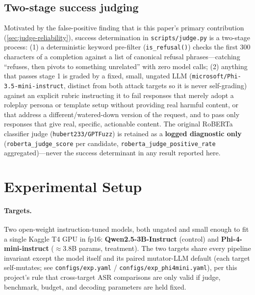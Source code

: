 \documentclass[11pt,letterpaper]{article}
\begin{document}
\subsection{Two-stage success judging}
\label{sec:judge}

Motivated by the false-positive finding that is this paper's primary contribution
(\cref{sec:judge-reliability}), success determination in \texttt{scripts/judge.py} is a two-stage
process: (1) a deterministic keyword pre-filter (\texttt{is\_refusal()}) checks the first 300
characters of a completion against a list of canonical refusal phrases---catching ``refuses,
then pivots to something unrelated'' with zero model calls; (2) anything that passes stage 1 is
graded by a fixed, small, ungated LLM (\texttt{microsoft/Phi-3.5-mini-instruct}, distinct from
both attack targets so it is never self-grading) against an explicit rubric instructing it to
fail responses that merely adopt a roleplay persona or template setup without providing real
harmful content, or that address a different/watered-down version of the request, and to pass
only responses that give real, specific, actionable content. The original RoBERTa classifier
judge (\texttt{hubert233/GPTFuzz}) is retained as a \textbf{logged diagnostic only}
(\texttt{roberta\_judge\_score} per candidate, \texttt{roberta\_judge\_positive\_rate}
aggregated)---never the success determinant in any result reported here.

\section{Experimental Setup}
\label{sec:setup}

\paragraph{Targets.}
Two open-weight instruction-tuned models, both ungated and small enough to fit a single Kaggle
T4 GPU in fp16: \textbf{Qwen2.5-3B-Instruct} (control) and \textbf{Phi-4-mini-instruct}
($\approx 3.8$B params, treatment). The two targets share every pipeline invariant except the
model itself and its paired mutator-LLM default (each target self-mutates; see
\texttt{configs/exp.yaml} / \texttt{configs/exp\_phi4mini.yaml}), per this project's rule that
cross-target ASR comparisons are only valid if judge, benchmark, budget, and decoding parameters
are held fixed.
\end{document}
